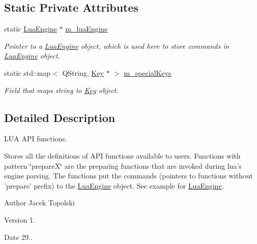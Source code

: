 \subsection*{Static Private Attributes}
\begin{DoxyCompactItemize}
\item 
static \hyperlink{class_lua_engine}{Lua\-Engine} $\ast$ \hyperlink{class_lua_api_engine_afff2b87b3c828c0904df2d7e6f6bd389}{m\-\_\-lua\-Engine}
\begin{DoxyCompactList}\small\item\em Pointer to a \hyperlink{class_lua_engine}{Lua\-Engine} object, which is used here to store commands in \hyperlink{class_lua_engine}{Lua\-Engine} object. \end{DoxyCompactList}\item 
static std\-::map$<$ Q\-String, \hyperlink{class_key}{Key} $\ast$ $>$ \hyperlink{class_lua_api_engine_a9fdba2d7f2f8d051453b5d1561435f5e}{m\-\_\-special\-Keys}
\begin{DoxyCompactList}\small\item\em Field that maps string to \hyperlink{class_key}{Key} object. \end{DoxyCompactList}\end{DoxyCompactItemize}


\subsection{Detailed Description}
L\-U\-A A\-P\-I functions. 

Stores all the definitions of A\-P\-I functions available to users. Functions with pattern \char`\"{}prepare\-X\char`\"{} are the preparing functions that are invoked during lua's engine parsing. The functions put the commands (pointers to functions without 'prepare' prefix) to the \hyperlink{class_lua_engine}{Lua\-Engine} object. See example for \hyperlink{class_lua_engine}{Lua\-Engine}. \begin{DoxyAuthor}{Author}
Jacek Topolski 
\end{DoxyAuthor}
\begin{DoxyVersion}{Version}
1. 
\end{DoxyVersion}
\begin{DoxyDate}{Date}
29.. 
\end{DoxyDate}


